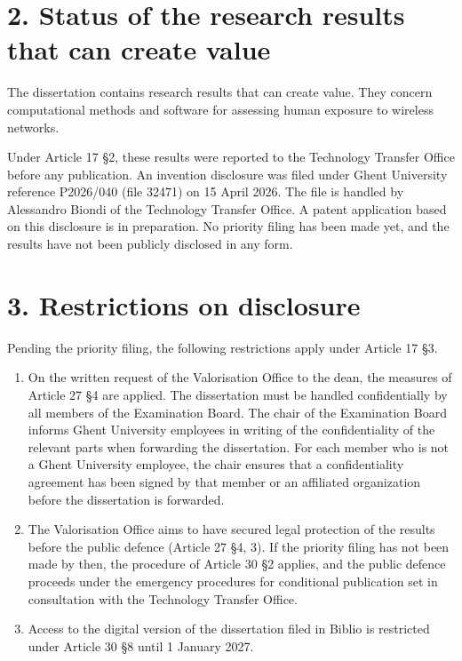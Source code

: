 \documentclass[10pt,a4paper]{article}
\begin{document}
\section*{2. Status of the research results that can create value}

The dissertation contains research results that can create value. They concern computational methods and software for assessing human exposure to wireless networks.

Under Article 17 \S 2, these results were reported to the Technology Transfer Office before any publication. An invention disclosure was filed under Ghent University reference P2026/040 (file 32471) on 15 April 2026. The file is handled by Alessandro Biondi of the Technology Transfer Office. A patent application based on this disclosure is in preparation. No priority filing has been made yet, and the results have not been publicly disclosed in any form.

\section*{3. Restrictions on disclosure}

Pending the priority filing, the following restrictions apply under Article 17 \S 3.

\begin{enumerate}[leftmargin=*]
\item On the written request of the Valorisation Office to the dean, the measures of Article 27 \S 4 are applied. The dissertation must be handled confidentially by all members of the Examination Board. The chair of the Examination Board informs Ghent University employees in writing of the confidentiality of the relevant parts when forwarding the dissertation. For each member who is not a Ghent University employee, the chair ensures that a confidentiality agreement has been signed by that member or an affiliated organization before the dissertation is forwarded.
\item The Valorisation Office aims to have secured legal protection of the results before the public defence (Article 27 \S 4, 3\textdegree). If the priority filing has not been made by then, the procedure of Article 30 \S 2 applies, and the public defence proceeds under the emergency procedures for conditional publication set in consultation with the Technology Transfer Office.
\item Access to the digital version of the dissertation filed in Biblio is restricted under Article 30 \S 8 until 1 January 2027.
\end{enumerate}
\end{document}

